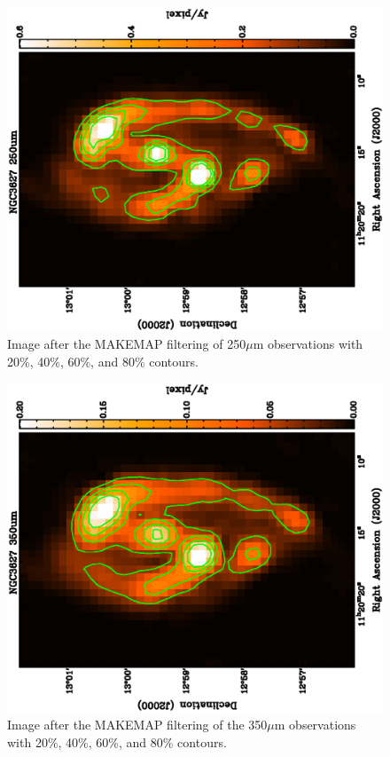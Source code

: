 \begin{figure}
  \centering
  \includegraphics[width=1.\textwidth,angle=270]{obs_imgs/250_rem.eps}
  \caption[NGC3627 250$\mu$m Observations]{Image after the MAKEMAP filtering of 250$\mu$m observations with 20\%, 40\%, 60\%, and 80\% contours.}
  \label{fig_250}
\end{figure}

\begin{figure}
  \centering
  \includegraphics[width=1.\textwidth,angle=270]{obs_imgs/350_rem.eps}
  \caption[NGC3627 350$\mu$m Observations]{Image after the MAKEMAP filtering of the 350$\mu$m observations with 20\%, 40\%, 60\%, and 80\% contours.}
  \label{fig_350}
\end{figure}

